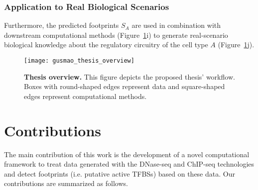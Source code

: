 \subsubsection{Application to Real Biological Scenarios}

Furthermore, the predicted footprints $S_A$ are used in combination with downstream computational methods (Figure~\ref{fig:gusmao_thesis_overview}i) to generate real-scenario biological knowledge about the regulatory circuitry of the cell type $A$ (Figure~\ref{fig:gusmao_thesis_overview}j).

\begin{figure}[h!]
\centering
\texttt{[image: gusmao\_thesis\_overview]}
\caption[Thesis overview]{\textbf{Thesis overview.} This figure depicts the proposed thesis' workflow. Boxes with round-shaped edges represent data and square-shaped edges represent computational methods.}
\label{fig:gusmao_thesis_overview}
\end{figure}


\section{Contributions}
\label{sec:contributions}

The main contribution of this work is the development of a novel computational framework to treat data generated with the DNase-seq and ChIP-seq technologies and detect footprints (i.e. putative active TFBSs) based on these data. Our contributions are summarized as follows.

